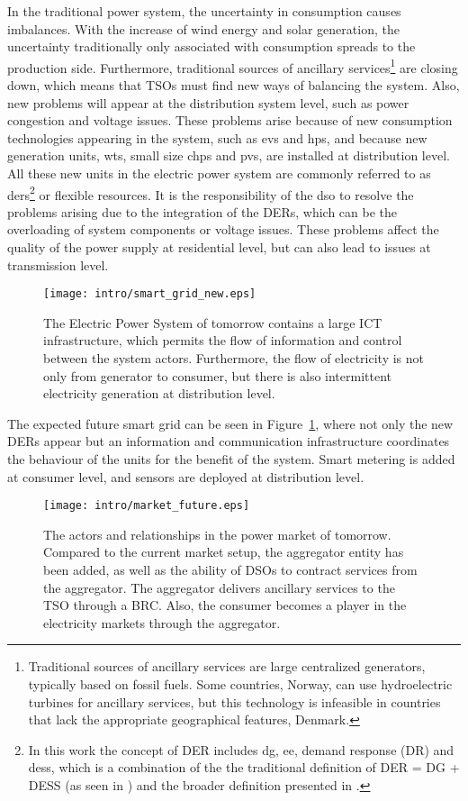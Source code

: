 In the traditional power system, the uncertainty in consumption causes imbalances. With the increase of wind energy and solar generation, the uncertainty traditionally only associated with consumption spreads to the production side. Furthermore, traditional sources of ancillary services\footnote{Traditional sources of ancillary services are large centralized generators, typically based on fossil fuels. Some countries, \eg Norway, can use hydroelectric turbines for ancillary services, but this technology is infeasible in countries that lack the appropriate geographical features, \eg Denmark.} are closing down, which means that TSOs must find new ways of balancing the system. Also, new problems will appear at the distribution system level, such as power congestion and voltage issues. These problems arise because of new consumption technologies appearing in the system, such as \glspl{ev} and \glspl{hp}, and because new generation units, \eg \glspl{wt}, small size \glspl{chp} and \glspl{pv}, are installed at distribution level. All these new units in the electric power system are commonly referred to as \glspl{der}\footnote[][-1em]{In this work the concept of DER includes \gls{dg}, \gls{ee}, demand response (DR) and \gls{dess}, which is a combination of the the traditional definition of DER = DG + DESS (as seen in \eg \cite{nrel2002using}) and the broader definition presented in \cite{nys2014reforming}.} or flexible resources. It is the responsibility of the \gls{dso} to resolve the problems arising due to the integration of the DERs, which can be the overloading of system components or voltage issues. These problems affect the quality of the power supply at residential level, but can also lead to issues at transmission level.
\begin{figure}[ht]
	\centering
	\caption{The Electric Power System of tomorrow contains a large ICT infrastructure, which permits the flow of information and control between the system actors. Furthermore, the flow of electricity is not only from generator to consumer, but there is also intermittent electricity generation at distribution level.}
	\texttt{[image: intro/smart\_grid\_new.eps]}\label{fig:powerfuture}
\end{figure}

The expected future smart grid can be seen in Figure~\ref{fig:powerfuture}, where not only the new DERs appear but an information and communication infrastructure coordinates the behaviour of the units for the benefit of the system. Smart metering is added at consumer level, and sensors are deployed at distribution level.
\begin{figure*}[htbp!]
	\centering
	\caption{The actors and relationships in the power market of tomorrow. Compared to the current market setup, the aggregator entity has been added, as well as the ability of DSOs to contract services from the aggregator. The aggregator delivers ancillary services to the TSO through a BRC. Also, the consumer becomes a player in the electricity markets through the aggregator.}
	\texttt{[image: intro/market\_future.eps]}\label{fig:marketfuture}
\end{figure*}

